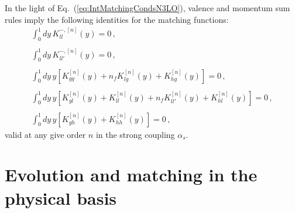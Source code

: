 \documentclass[10pt,a4paper]{article}
\begin{document}
In the light of Eq.~(\ref{eq:IntMatchingCondsN3LO}), valence and
momentum sum rules imply the following identities for the matching
functions:
\begin{equation}
\begin{array}{l}
\displaystyle\int_0^1dy\,K_{ll}^{-,[n]}(y)=0\,,\\
\\
\displaystyle\int_0^1dy\,K_{ll'}^{-,[n]}(y)=0\,,\\
\\
\displaystyle\int_0^1dy\,y\left[K_{gg}^{[n]}(y)+n_fK_{lg}^{[n]}(y)+K_{hg}^{[n]}(y)\right]=0\,,\\
\\
\displaystyle\int_0^1dy\,y\left[K_{gl}^{[n]}(y)+K_{ll}^{[n]}(y)+n_fK_{ll'}^{[n]}(y)+K_{hl}^{[n]}(y)\right]=0\,,\\
\\
\displaystyle\int_0^1dy\,y\left[K_{gh}^{[n]}(y)+K_{hh}^{[n]}(y)\right]=0\,,
\end{array}
\label{eq:QCDmatchingSumeRules}
\end{equation}
valid at any give order $n$ in the strong coupling $\alpha_s$.

\section{Evolution and matching in the physical basis}
\end{document}
